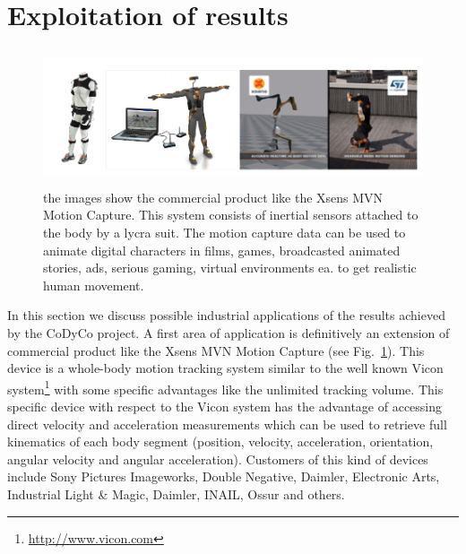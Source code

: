 \documentclass[12pt,a4paper,twoside]{article}
\begin{document}
\section{Exploitation of results} \label{sec:exploit}

\begin{figure} 
\begin{center}
\includegraphics[height=4cm]{images/mvn.png} 
\caption{the images show the commercial product like the Xsens MVN Motion Capture. This system consists of inertial sensors attached to the body by a lycra suit. The motion capture data can be used to animate digital characters in films, games, broadcasted animated stories, ads, serious gaming, virtual environments ea. to get realistic human movement.}\label{fig:xsens}
\end{center}
\end{figure}

In this section we discuss possible industrial applications of the results achieved by the CoDyCo project. A first area of application is definitively an extension of commercial product like the Xsens MVN Motion Capture (see Fig.~\ref{fig:xsens}). This device is a whole-body motion tracking system similar to the well known Vicon system\footnote{\url{http://www.vicon.com}} with some specific advantages like the unlimited tracking volume. This specific device with respect to the Vicon system has the advantage of accessing direct velocity and acceleration measurements which can be used to retrieve full kinematics of each body segment (position, velocity, acceleration, orientation, angular velocity and angular acceleration). Customers of this kind of devices include Sony Pictures Imageworks, Double Negative, Daimler, Electronic Arts, Industrial Light \& Magic, Daimler, INAIL, Ossur and others.
\end{document}
